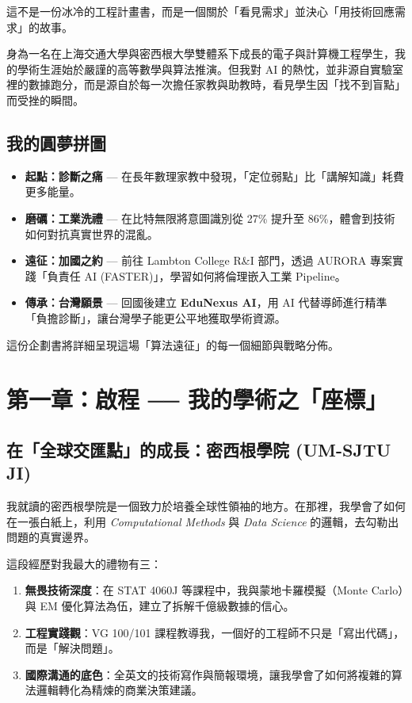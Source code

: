 \documentclass[12pt,a4paper]{article}
\begin{document}
這不是一份冰冷的工程計畫書，而是一個關於「看見需求」並決心「用技術回應需求」的故事。

身為一名在上海交通大學與密西根大學雙體系下成長的電子與計算機工程學生，我的學術生涯始於嚴謹的高等數學與算法推演。但我對 AI 的熱忱，並非源自實驗室裡的數據跑分，而是源自於每一次擔任家教與助教時，看見學生因「找不到盲點」而受挫的瞬間。

\subsection{我的圓夢拼圖}
\begin{itemize}
    \item \textbf{起點：診斷之痛} --- 在長年數理家教中發現，「定位弱點」比「講解知識」耗費更多能量。
    \item \textbf{磨礪：工業洗禮} --- 在比特無限將意圖識別從 27\% 提升至 86\%，體會到技術如何對抗真實世界的混亂。
    \item \textbf{遠征：加國之約} --- 前往 Lambton College R\&I 部門，透過 AURORA 專案實踐「負責任 AI (FASTER)」，學習如何將倫理嵌入工業 Pipeline。
    \item \textbf{傳承：台灣願景} --- 回國後建立 \textbf{EduNexus AI}，用 AI 代替導師進行精準「負擔診斷」，讓台灣學子能更公平地獲取學術資源。
\end{itemize}

這份企劃書將詳細呈現這場「算法遠征」的每一個細節與戰略分佈。

\newpage

\section{第一章：啟程 ── 我的學術之「座標」}

\subsection{在「全球交匯點」的成長：密西根學院 (UM-SJTU JI)}

我就讀的密西根學院是一個致力於培養全球性領袖的地方。在那裡，我學會了如何在一張白紙上，利用 \textit{Computational Methods} 與 \textit{Data Science} 的邏輯，去勾勒出問題的真實邊界。

這段經歷對我最大的禮物有三：
\begin{enumerate}
    \item \textbf{無畏技術深度}：在 STAT 4060J 等課程中，我與蒙地卡羅模擬（Monte Carlo）與 EM 優化算法為伍，建立了拆解千億級數據的信心。
    \item \textbf{工程實踐觀}：VG 100/101 課程教導我，一個好的工程師不只是「寫出代碼」，而是「解決問題」。
    \item \textbf{國際溝通的底色}：全英文的技術寫作與簡報環境，讓我學會了如何將複雜的算法邏輯轉化為精煉的商業決策建議。
\end{enumerate}
\end{document}
